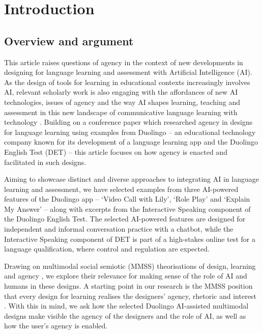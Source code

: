 \documentclass[english]{textolivre}
\begin{document}
\begin{polyabstract}
\begin{portuguese}
\begin{abstract}
\end{abstract}
\end{portuguese}
\end{polyabstract}

\section{Introduction}\label{sec-intro}
\subsection{Overview and argument}
This article raises questions of agency in the context of new developments in designing for language learning and assessment with Artificial Intelligence (AI). As the design of tools for learning in educational contexts increasingly involves AI, relevant scholarly work is also engaging with the affordances of new AI technologies, issues of agency and the way AI shapes learning, teaching and assessment in this new landscape of communicative language learning with technology \cite{cope2021education,karatza2024multimodal,lim2025editorial}. Building on a conference paper \cite{vondavier2025designing} which researched agency in designs for language learning using examples from Duolingo – an educational technology company known for its development of a language learning app and the Duolingo English Test (DET) – this article focuses on how agency is enacted and facilitated in such designs.

Aiming to showcase distinct and diverse approaches to integrating AI in language learning and assessment, we have selected examples from three AI-powered features of the Duolingo app – ‘Video Call with Lily’, ‘Role Play’ and ‘Explain My Answer’ – along with excerpts from the Interactive Speaking component of the Duolingo English Test. The selected AI-powered features are designed for independent and informal conversation practice with a chatbot, while the Interactive Speaking component of DET is part of a high-stakes online test for a language qualification, where control and regulation are expected.

Drawing on multimodal social semiotic (MMSS) theorisations of design, learning and agency \cite{bezemer2016multimodality,kress2010multimodality,selander2017design,diamantopoulou2024design}, we explore their relevance for making sense of the role of AI and humans in these designs. A starting point in our research is the MMSS position that every design for learning realises the designers’ agency, rhetoric and interest \cite{bezemer2016multimodality}. With this in mind, we ask how the selected Duolingo AI-assisted multimodal designs make visible the agency of the designers and the role of AI, as well as how the user’s agency is enabled.
\end{document}
